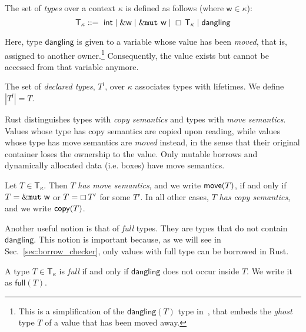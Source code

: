 \begin{definition}[Types] The set of \emph{types} over a context $\kappa$ is defined as follows (where $\mathsf{w}\in\kappa$):
\begin{displaymath}
    \mathsf{T}_\kappa
    ::=\ \mathsf{int}\;|\;\borrow\mathsf{w}\;|\;\mutborrow\mathsf{w}\;|\;\boxtype{\mathsf{T}_\kappa}\;|\;\mathsf{dangling}
\end{displaymath}
\end{definition}

Here, type $\mathsf{dangling}$ is given to a variable whose value has
been \emph{moved}, that is, assigned to another owner.\footnote{This
  is a simplification of the $\mathsf{dangling}(T)$ type
  in~\cite{Pea21}, that embeds the \emph{ghost} type $T$ of a value
  that has been moved away.}  Consequently, the value exists but
cannot be accessed from that variable anymore.

\begin{definition}
  The set of \emph{declared types}, $T^l$, over $\kappa$ associates
  types with lifetimes. We define $|T^l|=T$.
\end{definition}

Rust distinguishes types with {\em copy semantics} and types with {\em
  move semantics}.  Values whose type has copy semantics are copied
upon reading, while values whose type has move semantics are
\emph{moved} instead, in the sense that their original container loses
the ownership to the value. Only mutable borrows and dynamically
allocated data (i.e. boxes) have move semantics.

\begin{definition}\label{def:copy_move}
  Let $T\in\mathsf{T}_\kappa$. Then $T$ \emph{has move semantics}, and
  we write $\mathsf{move}(T)$, if and only if $T=\&\mathtt{mut}\ \mathsf{w}$ or
  $T=\boxempty\,{T'}$ for some $T'$. In all other cases, $T$ \emph{has
    copy semantics}, and we write $\mathsf{copy}(T)$.
\end{definition}

Another useful notion is that of \emph{full} types. They are types that do not contain
$\mathsf{dangling}$. This notion is important because, as we will see
in Sec.~\ref{sec:borrow_checker}, only values with full type can be borrowed in Rust.

\begin{definition}\label{def:full}
  A type $T\in\mathsf{T}_\kappa$ is \emph{full}
  if and only if $\mathsf{dangling}$ does not occur inside $T$.
  We write it as $\mathsf{full}(T)$.
\end{definition}

